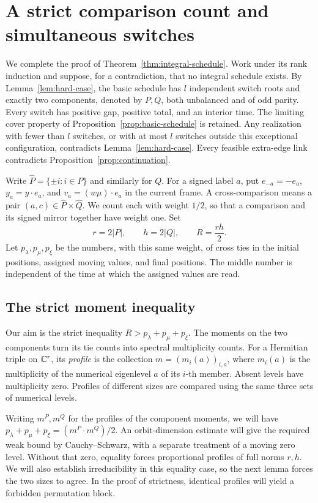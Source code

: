 \section{A strict comparison count and simultaneous switches}
\label{sec:moment-knots}

We complete the proof of Theorem~\ref{thm:integral-schedule}.  Work under
its rank induction and suppose, for a contradiction, that no integral
schedule exists.  By Lemma~\ref{lem:hard-case}, the basic schedule has
\(l\) independent switch roots and exactly two components, denoted by
\(P,Q\), both unbalanced and of odd parity.  Every switch has positive
gap, positive total, and an interior time.  The limiting cover property
of Proposition~\ref{prop:basic-schedule} is retained.  Any realization
with fewer than \(l\) switches, or with at most \(l\) switches outside
this exceptional configuration, contradicts Lemma~\ref{lem:hard-case}.
Every feasible extra-edge link contradicts
Proposition~\ref{prop:continuation}.

Write \(\widehat P=\{\pm i:i\in P\}\) and similarly for \(Q\).  For a
signed label \(a\), put \(e_{-a}=-e_a\), \(y_a=y\cdot e_a\), and
\(v_a=(w\mu)\cdot e_a\) in the current frame.  A cross-comparison means
a pair \((a,c)\in\widehat P\times\widehat Q\).  We count each with
weight \(1/2\), so that a comparison and its signed mirror together
have weight one.  Set
\[
 r=2|P|,\qquad h=2|Q|,\qquad R=\frac{rh}{2}.
\]
Let \(p_\lambda,p_\mu,p_\xi\) be the numbers, with this same weight,
of cross ties in the initial positions, assigned moving values, and
final positions.  The middle number is independent of the time at
which the assigned values are read.

\subsection{The strict moment inequality}

Our aim is the strict inequality \(R>p_\lambda+p_\mu+p_\xi\).
The moments on the two components turn its tie counts into spectral
multiplicity counts.  For a Hermitian triple on \(\mathbb C^r\), its
\emph{profile} is the collection
\(m=(m_i(a))_{i,a}\), where \(m_i(a)\) is the multiplicity of the
numerical eigenlevel \(a\) of its \(i\)-th member.  Absent levels have
multiplicity zero.  Profiles of different sizes are compared using
the same three sets of numerical levels.

Writing \(m^P,m^Q\) for the profiles of the component moments, we
will have \(p_\lambda+p_\mu+p_\xi=(m^P\cdot m^Q)/2\).
An orbit-dimension estimate will give the required weak bound by
Cauchy--Schwarz, with a separate treatment of a moving zero level.
Without that zero, equality forces proportional profiles of full
norms \(r,h\).  We will also establish irreducibility in this equality
case, so the next lemma forces the two sizes to agree.  In the proof
of strictness, identical profiles will yield a forbidden permutation
block.

